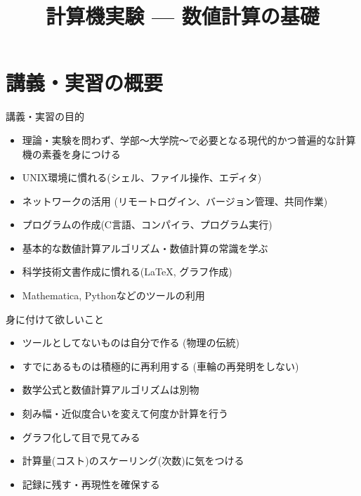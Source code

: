 \documentclass[dvipdfmx]{beamer}
\title{計算機実験 --- 数値計算の基礎}
\begin{document}

\begin{frame}
  \titlepage
  \tableofcontents
\end{frame}

\section{講義・実習の概要}

\begin{frame}[t]{講義・実習の目的}
  \begin{itemize}
  \item 理論・実験を問わず、学部〜大学院〜で必要となる現代的かつ普遍的な計算機の素養を身につける
  \item UNIX環境に慣れる(シェル、ファイル操作、エディタ)
  \item ネットワークの活用 (リモートログイン、バージョン管理、共同作業)
  \item プログラムの作成(C言語、コンパイラ、プログラム実行)
  \item 基本的な数値計算アルゴリズム・数値計算の常識を学ぶ
  \item 科学技術文書作成に慣れる(\LaTeX, グラフ作成)
  \item Mathematica, Pythonなどのツールの利用
  \end{itemize}
\end{frame}

\begin{frame}[t]{身に付けて欲しいこと}
  \begin{itemize}
  \item ツールとしてないものは自分で作る (物理の伝統)
  \item すでにあるものは積極的に再利用する (車輪の再発明をしない)
  \item 数学公式と数値計算アルゴリズムは別物
  \item 刻み幅・近似度合いを変えて何度か計算を行う
  \item グラフ化して目で見てみる
  \item 計算量(コスト)のスケーリング(次数)に気をつける
  \item 記録に残す・再現性を確保する
  \end{itemize}
\end{frame}
\end{document}
